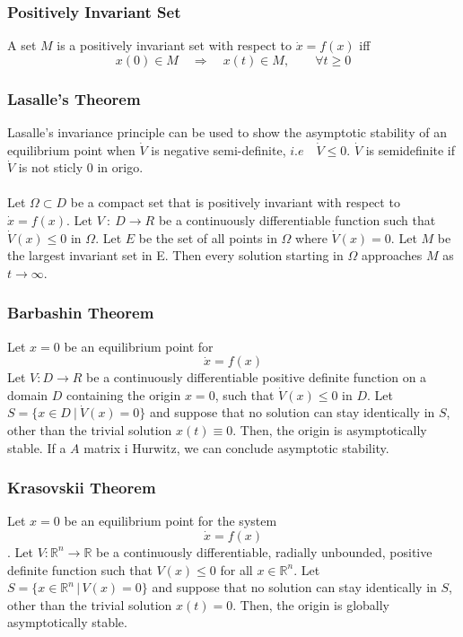 \documentclass{article}
\begin{document}
\subsubsection{Positively Invariant Set}
A set $M$ is a positively invariant set with respect to $\dot x = f(x)$ iff
\begin{equation*}
	x(0) \in M \quad \Rightarrow \quad x(t) \in M, \qquad \forall t \geq 0
\end{equation*}
\subsubsection{Lasalle's Theorem}
Lasalle's invariance principle can be used to show the asymptotic stability of
an equilibrium point when $\dot V$ is negative semi-definite, $i.e \quad \dot V
	\leq 0$. $\dot V$ is semidefinite if $\dot V$ is not sticly 0 in origo. \\\\
Let $\Omega \subset D$ be a compact set that is positively invariant with
respect to $\dot x = f(x)$. Let $V\::\:D \rightarrow R$ be a continuously
differentiable function such that $\dot V(x) \leq 0$ in $\Omega$. Let $E$ be
the set of all points in $\Omega$ where $\dot V(x) = 0$. Let $M$ be the largest
invariant set in E. Then every solution starting in $\Omega$ approaches $M$ as
$t \rightarrow \infty$.
\begin{figure}[h]
	\centering
	\def\svgwidth{0.5\columnwidth}
	
\end{figure}
\subsubsection{Barbashin Theorem}
Let $x=0$ be an equilibrium point for \[\dot{x} = f(x)\]
Let $V: D \rightarrow R$ be a continuously differentiable positive definite
function on a domain $D$ containing the origin $x=0$, such that $\dot V(x) \leq
	0$ in $D$. Let $S=\{x \in D\:|\:\dot V(x) = 0\}$ and suppose that no solution
can stay identically in $S$, other than the trivial solution $x(t) \equiv 0$.
Then, the origin is asymptotically stable. If a $A$ matrix i Hurwitz, we can
conclude asymptotic stability.
\subsubsection{Krasovskii Theorem}
Let \(x = 0\) be an equilibrium point for the system\[\dot{x} = f(x)\]. Let \(V : \mathbb{R}^n \to \mathbb{R}\) be a continuously differentiable, radially unbounded, positive definite function such that \(V(x) \leq 0\) for all \(x \in \mathbb{R}^n\). Let \(S = \{x \in \mathbb{R}^n \,|\, V(x) = 0\}\) and suppose that no solution can stay identically in \(S\), other than the trivial solution \(x(t) = 0\). Then, the origin is globally asymptotically stable.
\end{document}
